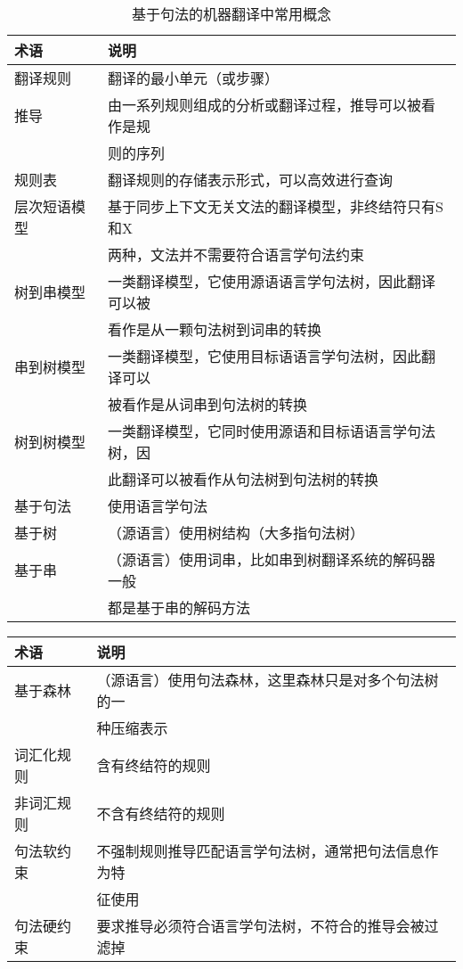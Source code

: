 \begin{table}[htp]{
\begin{center}
\caption{基于句法的机器翻译中常用概念}
\label{tab:4-2}
{
\begin{tabular}{p{6.5em} | l}
术语 & 说明 \\
\hline
\rule{0pt}{15pt}翻译规则 & 翻译的最小单元（或步骤） \\
\rule{0pt}{15pt}推导 & 由一系列规则组成的分析或翻译过程，推导可以被看作是规\\
&则的序列 \\
\rule{0pt}{15pt}规则表 & 翻译规则的存储表示形式，可以高效进行查询 \\
\rule{0pt}{15pt}层次短语模型 & 基于同步上下文无关文法的翻译模型，非终结符只有S和X\\
&两种，文法并不需要符合语言学句法约束 \\
\rule{0pt}{15pt}树到串模型 & 一类翻译模型，它使用源语语言学句法树，因此翻译可以被\\
&看作是从一颗句法树到词串的转换 \\
\rule{0pt}{15pt}串到树模型 & 一类翻译模型，它使用目标语语言学句法树，因此翻译可以\\
&被看作是从词串到句法树的转换 \\
\rule{0pt}{15pt}树到树模型 & 一类翻译模型，它同时使用源语和目标语语言学句法树，因\\
&此翻译可以被看作从句法树到句法树的转换 \\
\rule{0pt}{15pt}基于句法 & 使用语言学句法 \\
\rule{0pt}{15pt}基于树 &（源语言）使用树结构（大多指句法树） \\
\rule{0pt}{15pt}基于串 &（源语言）使用词串，比如串到树翻译系统的解码器一般\\
&都是基于串的解码方法 
\end{tabular}
}
\end{center}
}\end{table}
\begin{table}[htp]{
\begin{center}{
\begin{tabular}{p{6.5em} | l}
术语 & 说明 \\
\hline
\rule{0pt}{15pt}基于森林 &（源语言）使用句法森林，这里森林只是对多个句法树的一 \\
&种压缩表示 \\
\rule{0pt}{15pt}词汇化规则 & 含有终结符的规则 \\
\rule{0pt}{15pt}非词汇规则 & 不含有终结符的规则 \\
\rule{0pt}{15pt}句法软约束 & 不强制规则推导匹配语言学句法树，通常把句法信息作为特\\
&征使用 \\
\rule{0pt}{15pt}句法硬约束 & 要求推导必须符合语言学句法树，不符合的推导会被过滤掉 \\
\end{tabular}
}
\end{center}
}\end{table}

